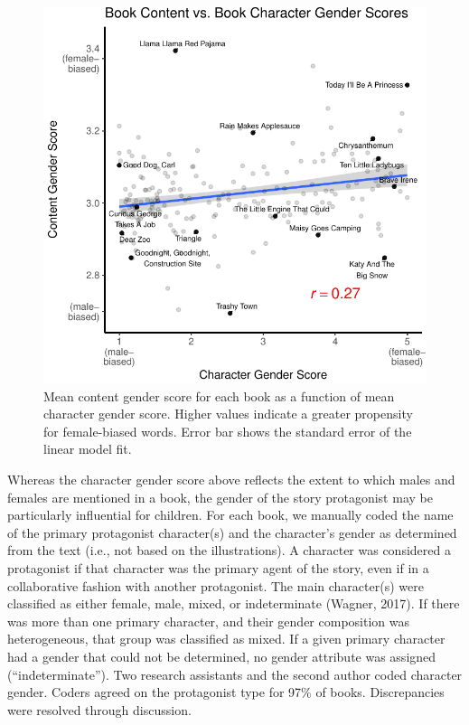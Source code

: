 \documentclass[
  english,
  ,man,floatsintext]{apa6}
\begin{document}
\begin{figure}[t!]
\includegraphics{kidbookgender_psych_sci_files/figure-latex/charactercontentplot-1} \caption{Mean content gender score for each book as a function of mean character gender score. Higher values indicate a greater propensity for female-biased words. Error bar shows the standard error of the linear model fit.}\label{fig:charactercontentplot}
\end{figure}

Whereas the character gender score above reflects the extent to which males and females are mentioned in a book, the gender of the story protagonist may be particularly influential for children. For each book, we manually coded the name of the primary protagonist character(s) and the character's gender as determined from the text (i.e., not based on the illustrations). A character was considered a protagonist if that character was the primary agent of the story, even if in a collaborative fashion with another protagonist. The main character(s) were classified as either female, male, mixed, or indeterminate (Wagner, 2017). If there was more than one primary character, and their gender composition was heterogeneous, that group was classified as mixed. If a given primary character had a gender that could not be determined, no gender attribute was assigned (\enquote{indeterminate}). Two research assistants and the second author coded character gender. Coders agreed on the protagonist type for 97\% of books. Discrepancies were resolved through discussion.
\end{document}
